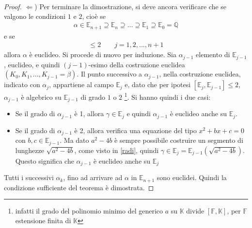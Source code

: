 \begin{proof} $\Leftarrow$)
Per terminare la dimostrazione, si deve ancora verificare che se valgono le condizioni $1$ e $2$, cioè se  
\begin{align*}
\alpha \in \mathbb{E}_{n+1} \supseteq \mathbb{E}_{n} \supseteq ...  \supseteq \mathbb{E}_{1} \supseteq \mathbb{E}_{0} = \mathbb{Q}
\end{align*}
e se 
\begin{align*}
[\mathbb{E}_{j}, \mathbb{E}_{j-1}]  \leq  2  \qquad j = 1, 2 , ... , n+1
\end{align*}
allora $\alpha$ è euclideo.
Si procede di nuovo per induzione. Sia $\alpha_{j-1}$ elemento di $\mathbb{E}_{j-1}$, euclideo, e quindi $(j-1)$-esimo della costruzione euclidea $(K_0, K_1, ..., K_{j-1} = \beta)$. Il punto successivo a $\alpha_{j-1}$, nella costruzione euclidea, indicato con $\alpha_{j}$, appartiene al campo $\mathbb{E}_{j}$ e, dato che per ipotesi $[\mathbb{E}_{j}, \mathbb{E}_{j-1}]  \leq  2$, $\alpha_{j-1}$ è algebrico su $\mathbb{E}_{j-1}$  di grado $1$ o $2$
\footnote{infatti il grado del polinomio minimo del generico $a$ su $\mathbb{K}$ divide $[\mathbb{F}, \mathbb{K}]$, per $\mathbb{F}$ estensione finita di $\mathbb{K}$ }. 
Si hanno quindi i due casi:

\begin{itemize}

\item Se il grado di $\alpha_{j-1}$ è 1, allora $\gamma \in \mathbb{E}_{j}$ e quindi $\alpha_{j-1}$ è euclideo anche su $\mathbb{E}_{j}$.

\item Se il grado di $\alpha_{j-1}$ è 2, allora verifica una equazione del tipo $x^2 + bx + c =  0$ con $b,c \in \mathbb{E}_{j-1}$. Ma dato $a^2-4b$ è sempre possibile costruire un segmento di lunghezze $\sqrt{a^2-4b}$, come visto in \ref{radi}, quindi $\gamma \in \mathbb{E}_{j} = \mathbb{E}_{j-1}(\sqrt{a^2-4b})$. Questo significa che $\alpha_{j-1}$ è euclideo anche su $\mathbb{E}_{j}$
\end{itemize}

Tutti i successivi $\alpha_{k}$, fino ad arrivare ad $\alpha$ in $\mathbb{E}_{n+1}$ sono euclidei. Quindi la condizione sufficiente del teorema è dimostrata.
\end{proof}


